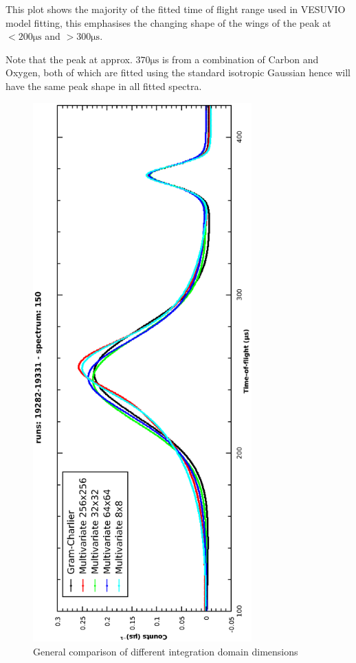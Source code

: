 \documentclass[a4paper]{article}
\begin{document}
This plot shows the majority of the fitted time of flight range used in VESUVIO
model fitting, this emphasises the changing shape of the wings of the peak at
$< 200 \mathrm{\mu s}$ and $> 300 \mathrm{\mu s}$.

Note that the peak at approx. $370 \mathrm{\mu s}$ is from a combination of
Carbon and Oxygen, both of which are fitted using the standard isotropic
Gaussian hence will have the same peak shape in all fitted spectra.

\begin{figure}[h!]
  \centering
  \begin{turn}{-90}
    \includegraphics[width=0.75\textwidth]{graphics/mvg_integration_compare_1.eps}
  \end{turn}
  \vspace{-80pt}
  \caption{General comparison of different integration domain dimensions}
  \label{fig:mvg_integration_compare_1}
\end{figure}
\FloatBarrier
\end{document}
